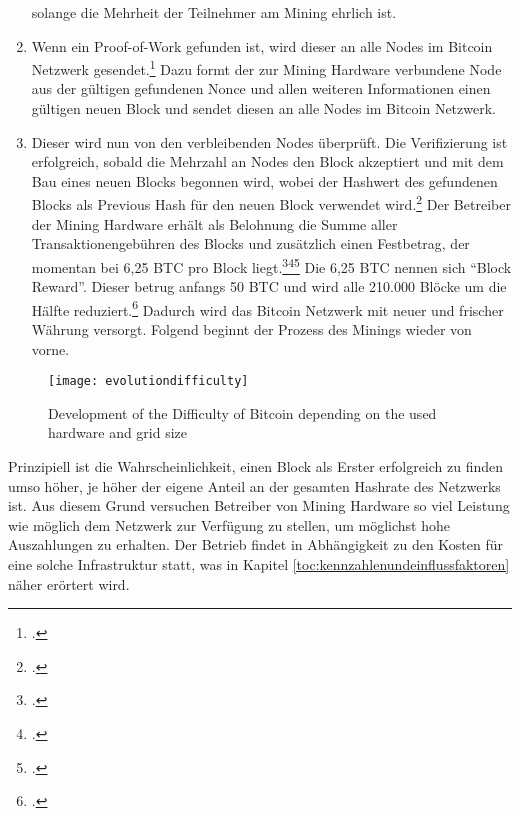 \begin{enumerate}
    solange die Mehrheit der Teilnehmer am Mining ehrlich ist. 
    \item Wenn ein Proof-of-Work gefunden ist, wird dieser an alle Nodes im Bitcoin Netzwerk
    gesendet.\footcite[Cf.][pp. 3]{nakamoto2008bitcoin} Dazu formt der zur Mining Hardware verbundene Node aus der
    gültigen gefundenen Nonce und allen weiteren Informationen einen gültigen neuen Block und sendet diesen an alle
    Nodes im Bitcoin Netzwerk.
    \item Dieser wird nun von den verbleibenden Nodes überprüft. Die Verifizierung ist erfolgreich, sobald die Mehrzahl
    an Nodes den Block akzeptiert und mit dem Bau eines neuen Blocks begonnen wird, wobei der Hashwert des gefundenen
    Blocks als Previous Hash für den neuen Block verwendet wird.\footcite[Cf.][pp. 3]{nakamoto2008bitcoin}
    Der Betreiber der Mining Hardware erhält als Belohnung die Summe aller Transaktionengebühren des Blocks und
    zusätzlich einen Festbetrag, der momentan bei 6,25 \ac{BTC} pro Block
    liegt.\footcite[Cf.][p. 4]{nakamoto2008bitcoin}\footcite[Cf.][]{btcecho2021halving}\footcite[Cf.][p. 59]{taylor2017evolution}
    Die 6,25 \ac{BTC} nennen sich "`Block Reward"'. Dieser betrug anfangs 50 \ac{BTC} und wird alle 210.000 Blöcke um
    die Hälfte reduziert.\footcite[Cf.][p. 58]{taylor2017evolution} Dadurch wird das Bitcoin Netzwerk mit neuer und
    frischer Währung versorgt. Folgend beginnt der Prozess des Minings wieder von vorne.
\end{enumerate}

\begin{figure}[H]
    \caption{Development of the Difficulty of Bitcoin depending on the used hardware and grid size}
    \texttt{[image: evolutiondifficulty]}
    \label{figure:evolutiondifficulty}
    \\
    \cite[Source: ][Fig. 1b]{taylor2017evolution}
\end{figure}

Prinzipiell ist die Wahrscheinlichkeit, einen Block als Erster erfolgreich zu finden umso höher, je höher der eigene
Anteil an der gesamten Hashrate des Netzwerks ist. Aus diesem Grund versuchen Betreiber von Mining Hardware so viel
Leistung wie möglich dem Netzwerk zur Verfügung zu stellen, um möglichst hohe Auszahlungen zu erhalten. Der Betrieb
findet in Abhängigkeit zu den Kosten für eine solche Infrastruktur statt, was in Kapitel
\ref{toc:kennzahlenundeinflussfaktoren} näher erörtert wird.

